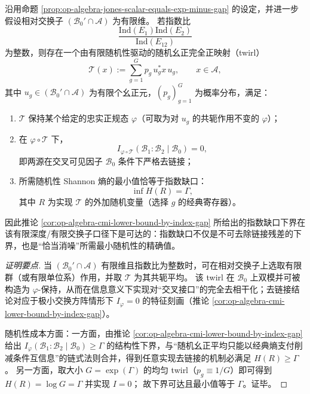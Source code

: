 \begin{proposition}\label{prop:op-algebra-twirl-achieves-index-gap}
沿用命题 \ref{prop:op-algebra-jones-scalar-equals-exp-minus-gap} 的设定，并进一步假设相对交换子 \((\mathcal{B}_0'\cap\mathcal{A})\) 为有限维。
若指数比
\[
\frac{\mathrm{Ind}(E_1)\mathrm{Ind}(E_2)}{\mathrm{Ind}(E_{12})}
\]
为整数，则存在一个由有限随机性驱动的随机幺正完全正映射（twirl）
\[
\mathcal{T}(x):=\sum_{g=1}^{G}p_g\,u_g^\ast x\,u_g,\qquad x\in\mathcal{A},
\]
其中 \(u_g\in(\mathcal{B}_0'\cap\mathcal{A})\) 为有限个幺正元，\((p_g)_{g=1}^{G}\) 为概率分布，满足：
\begin{enumerate}
  \item \(\mathcal{T}\) 保持某个给定的忠实正规态 \(\varphi\)（可取为对 \(u_g\) 的共轭作用不变的 \(\varphi\)）；
  \item 在 \(\varphi\circ\mathcal{T}\) 下，
  \[
  \boxed{\;
  I_{\varphi\circ\mathcal{T}}(\mathcal{B}_1:\mathcal{B}_2\mid\mathcal{B}_0)=0, \;}
  \]
  即两源在交叉可见因子 \(\mathcal{B}_0\) 条件下严格去链接；
  \item 所需随机性 Shannon 熵的最小值恰等于指数缺口：
  \[
  \boxed{\;
  \inf H(R)=\Gamma, \;}
  \]
  其中 \(R\) 为实现 \(\mathcal{T}\) 的外加随机变量（选择 \(g\) 的经典寄存器）。
\end{enumerate}
因此推论 \ref{cor:op-algebra-cmi-lower-bound-by-index-gap} 所给出的指数缺口下界在该有限深度/有限交换子口径下是可达的：指数缺口不仅是不可去除链接残差的下界，也是“恰当消噪”所需最小随机性的精确值。
\end{proposition}
\begin{proof}[证明要点]
当 \((\mathcal{B}_0'\cap\mathcal{A})\) 有限维且指数比为整数时，可在相对交换子上选取有限群（或有限单位系）作用，并取 \(\mathcal{T}\) 为其共轭平均。
该 twirl 在 \(\mathcal{B}_0\) 上双模并可被构造为 \(\varphi\)-保持，从而在信息意义下实现对“交叉接口”的完全去相干化；去链接结论对应于极小交换方阵情形下 \(I_\varphi=0\) 的特征刻画（推论 \ref{cor:op-algebra-cmi-lower-bound-by-index-gap}）。
\par
随机性成本方面：一方面，由推论 \ref{cor:op-algebra-cmi-lower-bound-by-index-gap} 给出 \(I_\varphi(\mathcal{B}_1:\mathcal{B}_2\mid\mathcal{B}_0)\ge\Gamma\) 的结构性下界，与“随机幺正平均只能以经典熵支付削减条件互信息”的链式法则合并，得到任意实现去链接的机制必满足 \(H(R)\ge\Gamma\)。
另一方面，取大小 \(G=\exp(\Gamma)\) 的均匀 twirl（\(p_g\equiv 1/G\)）即可得到 \(H(R)=\log G=\Gamma\) 并实现 \(I=0\)；
故下界可达且最小值等于 \(\Gamma\)。证毕。
\end{proof}

